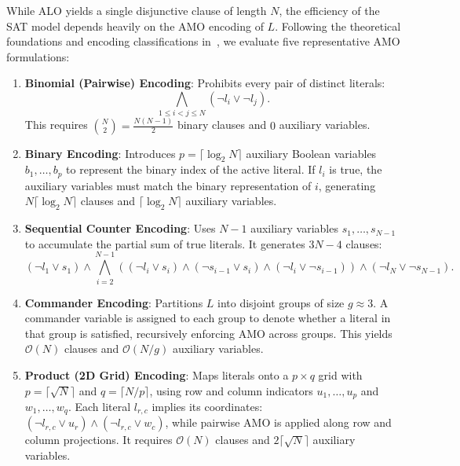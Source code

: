 \documentclass[a4paper,fleqn]{cas-sc}
\begin{document}
While ALO yields a single disjunctive clause of length $N$, the efficiency of the SAT model depends heavily on the AMO encoding of $L$. Following the theoretical foundations and encoding classifications in~\cite{SAT_book, khanh_lecture_slides}, we evaluate five representative AMO formulations:
\begin{enumerate}
    \item \textbf{Binomial (Pairwise) Encoding}: Prohibits every pair of distinct literals:
    \begin{equation}
        \bigwedge_{1 \le i < j \le N} (\neg l_i \lor \neg l_j).
    \end{equation}
    This requires $\binom{N}{2} = \frac{N(N-1)}{2}$ binary clauses and $0$ auxiliary variables.
    
    \item \textbf{Binary Encoding}: Introduces $p = \lceil \log_2 N \rceil$ auxiliary Boolean variables $b_1, \dots, b_p$ to represent the binary index of the active literal. If $l_i$ is true, the auxiliary variables must match the binary representation of $i$, generating $N \lceil \log_2 N \rceil$ clauses and $\lceil \log_2 N \rceil$ auxiliary variables.
    
    \item \textbf{Sequential Counter Encoding}: Uses $N-1$ auxiliary variables $s_1, \dots, s_{N-1}$ to accumulate the partial sum of true literals. It generates $3N - 4$ clauses:
    \begin{equation}
        (\neg l_1 \lor s_1) \land \bigwedge_{i=2}^{N-1} \left( (\neg l_i \lor s_i) \land (\neg s_{i-1} \lor s_i) \land (\neg l_i \lor \neg s_{i-1}) \right) \land (\neg l_N \lor \neg s_{N-1}).
    \end{equation}
    
    \item \textbf{Commander Encoding}: Partitions $L$ into disjoint groups of size $g \approx 3$. A commander variable is assigned to each group to denote whether a literal in that group is satisfied, recursively enforcing AMO across groups. This yields $\mathcal{O}(N)$ clauses and $\mathcal{O}(N/g)$ auxiliary variables.
    
    \item \textbf{Product (2D Grid) Encoding}: Maps literals onto a $p \times q$ grid with $p = \lceil\sqrt{N}\rceil$ and $q = \lceil N/p \rceil$, using row and column indicators $u_1, \dots, u_p$ and $w_1, \dots, w_q$. Each literal $l_{r, c}$ implies its coordinates: $(\neg l_{r, c} \lor u_r) \land (\neg l_{r, c} \lor w_c)$, while pairwise AMO is applied along row and column projections. It requires $\mathcal{O}(N)$ clauses and $2\lceil\sqrt{N}\rceil$ auxiliary variables.
\end{enumerate}
\end{document}
